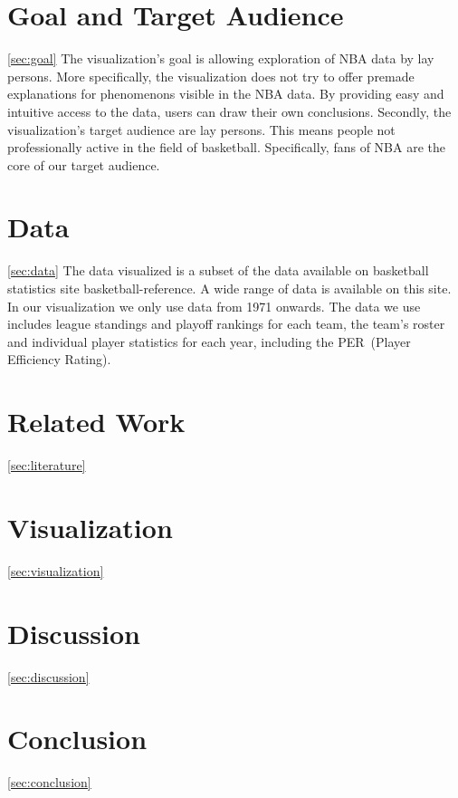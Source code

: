 \documentclass{sigchi}
\begin{document}
\section{Goal and Target Audience}\ref{sec:goal}
The visualization's goal is allowing exploration of NBA data by lay persons.
More specifically, the visualization does not try to offer premade explanations
for phenomenons visible in the NBA data. By providing easy and intuitive access
to the data, users can draw their own conclusions. 
Secondly, the visualization's target audience are lay persons. This means people
not professionally active in the field of basketball. Specifically, fans of NBA
are the core of our target audience. 

\section{Data}\ref{sec:data}
The data visualized is a subset of the data available on basketball statistics
site basketball-reference\cite{basketball-reference}. A wide range of data is
available on this site. In our visualization we only use data from 1971 onwards.
The data we use includes league standings and playoff rankings for each team,
the team's roster and individual player statistics for each year, including the
PER~(Player Efficiency Rating).

\section{Related Work}\ref{sec:literature}
\section{Visualization}\ref{sec:visualization}
\section{Discussion}\ref{sec:discussion}
\section{Conclusion}\ref{sec:conclusion}


%
%
%
%
%
\balance{}



\end{document}
